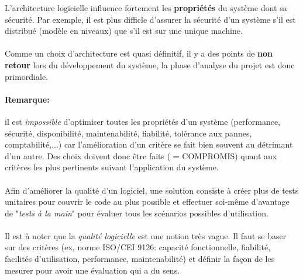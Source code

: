 \item{}
{\vrai}
{L'architecture logicielle influence fortement les \textbf{propriétés} du système dont sa sécurité. Par exemple, il est plus difficle d'assurer la sécurité d'un système s'il est distribué (modèle en niveaux) que s'il est sur une unique machine.
\paragraph{}
Comme un choix d'architecture est quasi définitif, il y a des points de \textbf{non retour} lors du développement du système, la phase d'analyse du projet est donc primordiale.
\paragraph{Remarque:} il est \textit{impossible} d'optimiser toutes les propriétés d'un système (performance, sécurité, disponibilité, maintenabilité, fiabilité, tolérance aux pannes, comptabilité,...) car l'amélioration d'un critère se fait bien souvent au détrimant d'un autre. Des choix doivent donc être faits ( = COMPROMIS) quant aux critères les plus pertinents suivant l'application du système.

\paragraph{}
Afin d'améliorer la qualité d'un logiciel, une solution consiste à créer plus de tests unitaires pour couvrir le code au plus possible et effectuer soi-même d'avantage de "\textit{tests à la main}" pour évaluer tous les scénarios possibles d'utilisation. 
\paragraph{}Il est à noter que la \textit{qualité logicielle} est une notion très vague. Il faut se baser sur des critères (ex, norme ISO/CEI 9126: capacité fonctionnelle, fiabilité, facilités d'utilisation, performance, maintenabilité) et définir la façon de les mesurer pour avoir une évaluation qui a du sens.
}


